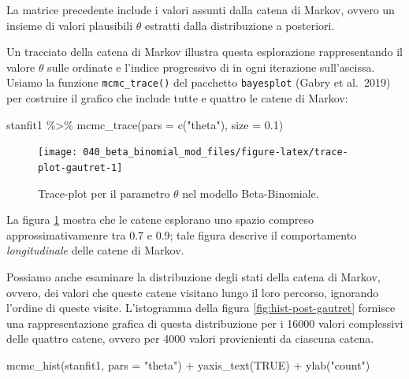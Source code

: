 \documentclass[
  10pt,
  italian,
  a4paper,
  extrafontsizes,onecolumn,openright
  ]{memoir}
\newenvironment{Shaded}{\begin{snugshade}}{\end{snugshade}}
\newcommand{\AttributeTok}[1]{\textcolor[rgb]{0.77,0.63,0.00}{#1}}
\newcommand{\ConstantTok}[1]{\textcolor[rgb]{0.00,0.00,0.00}{#1}}
\newcommand{\FloatTok}[1]{\textcolor[rgb]{0.00,0.00,0.81}{#1}}
\newcommand{\FunctionTok}[1]{\textcolor[rgb]{0.00,0.00,0.00}{#1}}
\newcommand{\NormalTok}[1]{#1}
\newcommand{\SpecialCharTok}[1]{\textcolor[rgb]{0.00,0.00,0.00}{#1}}
\newcommand{\StringTok}[1]{\textcolor[rgb]{0.31,0.60,0.02}{#1}}
\begin{document}
\noindent
La matrice precedente include i valori assunti dalla catena di Markov, ovvero un insieme di valori plausibili \(\theta\) estratti dalla distribuzione a posteriori.

Un tracciato della catena di Markov illustra questa esplorazione rappresentando il valore \(\theta\) sulle ordinate e l'indice progressivo di in ogni iterazione sull'ascissa. Usiamo la funzione \texttt{mcmc\_trace()} del pacchetto \texttt{bayesplot} (Gabry et al.~2019) per costruire il grafico che include tutte e quattro le catene di Markov:

\begin{Shaded}
\begin{Highlighting}[]
\NormalTok{stanfit1 }\SpecialCharTok{\%\textgreater{}\%} 
  \FunctionTok{mcmc\_trace}\NormalTok{(}\AttributeTok{pars =} \FunctionTok{c}\NormalTok{(}\StringTok{"theta"}\NormalTok{), }\AttributeTok{size =} \FloatTok{0.1}\NormalTok{)}
\end{Highlighting}
\end{Shaded}

\begin{figure}[h]

{\centering \texttt{[image: 040\_beta\_binomial\_mod\_files/figure-latex/trace-plot-gautret-1]} 

}

\caption{Trace-plot per il parametro $\theta$ nel modello Beta-Binomiale.}\label{fig:trace-plot-gautret}
\end{figure}

\noindent
La figura \ref{fig:trace-plot-gautret} mostra che le catene esplorano uno spazio compreso approssimativamenre tra 0.7 e 0.9; tale figura descrive il comportamento \emph{longitudinale} delle catene di Markov.

Possiamo anche esaminare la distribuzione degli stati della catena di Markov, ovvero, dei valori che queste catene visitano lungo il loro percorso, ignorando l'ordine di queste visite. L'istogramma della figura \ref{fig:hist-post-gautret} fornisce una rappresentazione grafica di questa distribuzione per i 16000 valori complessivi delle quattro catene, ovvero per 4000 valori provienienti da ciascuna catena.

\begin{Shaded}
\begin{Highlighting}[]
\FunctionTok{mcmc\_hist}\NormalTok{(stanfit1, }\AttributeTok{pars =} \StringTok{"theta"}\NormalTok{) }\SpecialCharTok{+} 
  \FunctionTok{yaxis\_text}\NormalTok{(}\ConstantTok{TRUE}\NormalTok{) }\SpecialCharTok{+} 
  \FunctionTok{ylab}\NormalTok{(}\StringTok{"count"}\NormalTok{)}
\end{Highlighting}
\end{Shaded}
\end{document}
